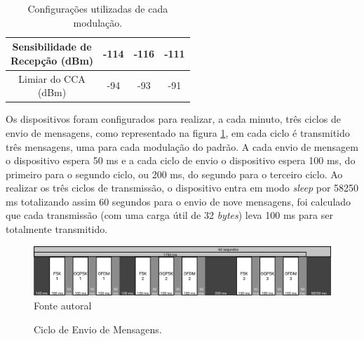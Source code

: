 \begin{table}[h!]
\begin{tabular}{|c c c c|}
        \makecell{Sensibilidade de                 \\Recepção (dBm)       } & -114    & -116                     & -111     \\\hline
        \makecell{Limiar do CCA                    \\(dBm)                   } & -94     & -93                      & -91      \\ \hline
        \hline
    \end{tabular}
    \caption{Configurações utilizadas de cada modulação.}
    \label{table:config}
\end{table}

Os dispositivos foram configurados para realizar, a cada minuto, três ciclos de envio de mensagens, como representado na figura \ref{fig:ciclo_envio}, em cada ciclo é transmitido três mensagens, uma para cada modulação do padrão. A cada envio de mensagem o dispositivo espera 50 ms e a cada ciclo de envio o dispositivo espera 100 ms, do primeiro para o segundo ciclo, ou 200 ms, do segundo para o terceiro ciclo. Ao realizar os três ciclos de transmissão, o dispositivo entra em modo \emph{sleep} por 58250 ms totalizando assim 60 segundos para o envio de nove mensagens, foi calculado que cada transmissão (com uma carga útil de 32 \emph{bytes}) leva 100 ms para ser totalmente transmitido.

\begin{figure}[h]
    \centering
    \caption{Ciclo de Envio de Mensagens.}
    \includegraphics[width=\textwidth]{./sections/textual/chapters/images/metodo_ciclo_envio.png}\\
    Fonte autoral
    \label{fig:ciclo_envio}
\end{figure}

